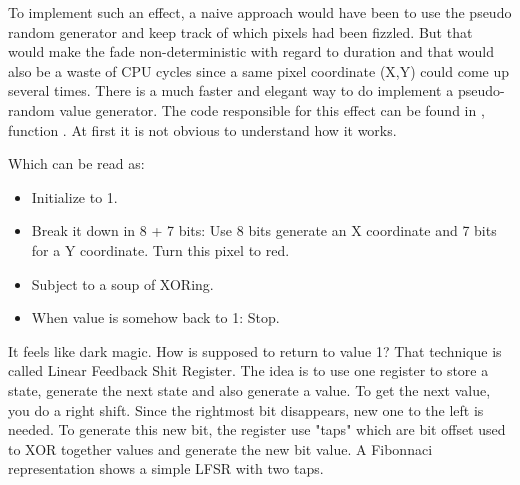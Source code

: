 To implement such an effect, a naive approach would have been to use the pseudo random generator  and keep track of which pixels had been fizzled. But that would make the fade non-deterministic with regard to duration and that would also be a waste of CPU cycles since a same pixel coordinate (X,Y) could come up several times. There is a much faster and elegant way to do implement a pseudo-random value generator. The code responsible for this effect can be found in , function . At first it is not obvious to understand how it works.\\
\par
\begin{minipage}{\textwidth}

\end{minipage}
\par
Which can be read as:\\
\begin{itemize}
\item Initialize  to 1.
\item Break it down in 8 + 7 bits: Use 8 bits generate an X coordinate and 7 bits for a Y coordinate. Turn this pixel to red.
\item Subject  to a soup of XORing.
\item When  value is somehow back to 1: Stop.
\end{itemize}        
It feels like dark magic. How is  supposed to return to value 1? That technique is called Linear Feedback Shit Register. The idea is to use one register to store a state, generate the next state and also generate a value. To get the next value, you do a right shift. Since the rightmost bit disappears, new one to the left is needed. To generate this new bit, the register use "taps" which are bit offset used to XOR together values and generate the new bit value. A Fibonnaci representation shows a simple LFSR with two taps.\\
\par

